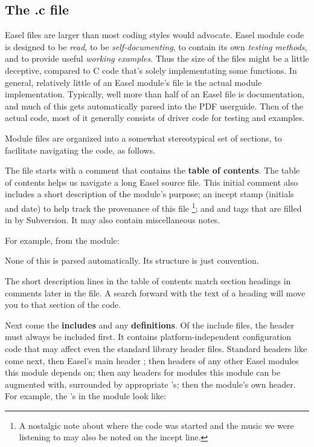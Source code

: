 \subsection{The .c file}

Easel  files are larger than most coding styles would
advocate. Easel module code is designed to be \emph{read}, to be
\emph{self-documenting}, to contain its own \emph{testing methods},
and to provide useful \emph{working examples}.  Thus the size of the
files might be a little deceptive, compared to C code that's solely
implementating some functions. In general, relatively little of an
Easel module's  file is the actual module implementation.
Typically, well more than half of an Easel  file is
documentation, and much of this gets automatically parsed into the PDF
userguide. Then of the actual code, most of it generally consists of
driver code for testing and examples.

Module files are organized into a somewhat stereotypical set of
sections, to facilitate navigating the code, as follows.

The  file starts with a comment that contains the {\bfseries
  table of contents}. The table of contents helps us navigate a long
Easel source file. This initial comment also includes a short
description of the module's purpose; an incept stamp (initials and
date) to help track the provenance of this file \footnote{A nostalgic
  note about where the code was started and the music we were
  listening to may also be noted on the incept line.}; and  and  tags that are filled in by
Subversion. It may also contain miscellaneous notes.

For example, from the  module:



None of this is parsed automatically. Its structure is just
convention.

The short description lines in the table of contents match section
headings in comments later in the file. A search forward with the text
of a heading will move you to that section of the code.

Next come the {\bfseries includes} and any {\bf definitions}. Of the
include files, the  header must always be
included first. It contains platform-independent configuration code
that may affect even the standard library header files. Standard
headers like  come next, then Easel's main header
; then headers of any other Easel modules this module
depends on; then any headers for modules this module can be augmented
with, surrounded by appropriate 's; then the module's
own header. For example, the 's in the
 module look like:

